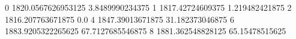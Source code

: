 0 1820.0567626953125 3.8489990234375
1 1817.42724609375 1.219482421875
2 1816.207763671875 0.0
4 1847.39013671875 31.182373046875
6 1883.9205322265625 67.7127685546875
8 1881.362548828125 65.15478515625
